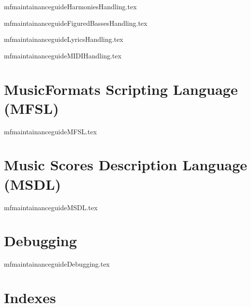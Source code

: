 \documentclass[11pt,a4paper]{report}
\begin{document}
{mfmaintainanceguideHarmoniesHandling.tex}

{mfmaintainanceguideFiguredBassesHandling.tex}

{mfmaintainanceguideLyricsHandling.tex}

{mfmaintainanceguideMIDIHandling.tex}


\part{MusicFormats Scripting Language (MFSL)}

{mfmaintainanceguideMFSL.tex}


\part{Music Scores Description Language (MSDL)}

{mfmaintainanceguideMSDL.tex}


\part{Debugging}

{mfmaintainanceguideDebugging.tex}



\part{Indexes}


\useListsPagesHeadersAndFooters

\printindex[Files]

\printindex[Types]
\printindex[MethodsAndFields]

\printindex[ConstantsFunctionsAndVariables]

\printindex[Options]

\printindex[MusicXML]

\printindex[Main]


\end{document}
